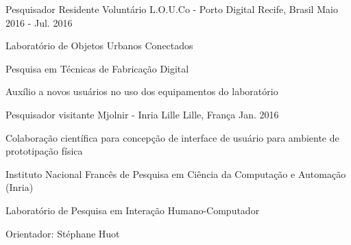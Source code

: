 \begin{cventries}
% 
% 
% 
\cventry
	{Pesquisador Residente Voluntário}
	{L.O.U.Co - Porto Digital}
	{Recife, Brasil}
	{Maio 2016 - Jul. 2016}
	{\begin{cvitems}
		\item{Laboratório de Objetos Urbanos Conectados}
		\item{Pesquisa em Técnicas de Fabricação Digital}
		\item{Auxílio a novos usuários no uso dos equipamentos do laboratório}
	\end{cvitems}}

\cventry
	{Pesquisador visitante}
	{Mjolnir - Inria Lille}
	{Lille, França}
	{Jan. 2016}
	{\begin{cvitems}
		\item{Colaboração científica para concepção de interface de usuário para ambiente de prototipação física}
		\item{Instituto Nacional Francês de Pesquisa em Ciência da Computação e Automação (Inria)}
		\item{Laboratório de Pesquisa em Interação Humano-Computador}
		\item{Orientador: Stéphane Huot}
	\end{cvitems}}


\end{cventries}
